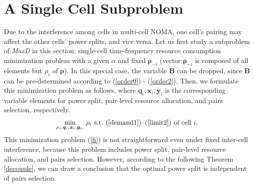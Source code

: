 \documentclass[10pt,journal,final,finalsubmission,twocolumn]{IEEEtran}
\begin{document}
\section{A Single Cell Subproblem}\label{CellLoadsMinimization}

Due to the interference among cells in multi-cell NOMA, one cell's pairing may affect the other cells' power splits, and vice versa. Let us first study a subproblem of {\em MaxD} in this section: single-cell time-frequency resource consumption minimization problem with a given $\alpha$ and fixed $\boldsymbol{\rho}_{-i}$ (vector $\boldsymbol{\rho}_{-i}$ is composed of all elements but $\rho_i$ of $\boldsymbol{\rho}$). In this special case, the variable $\boldsymbol{B}$ can be dropped, since $\boldsymbol{B}$ can be pre-determined according to (\ref{order0}) - (\ref{order2}). Then, we formulate this minimization problem as follows, where $\boldsymbol{q}_i,\boldsymbol{x}_i,\boldsymbol{y}_i$ is the corresponding variable elements for power split, pair-level resource allocation, and pairs selection, respectively.
\begin{equation}\label{fi}
 \underset{\rho_i, \boldsymbol{q}_i,\boldsymbol{x}_i,\boldsymbol{y}_i,}{\min} \  \rho_i \ \textup{s.t.\ (\ref{demand1})--(\ref{limit2}) of cell $i$} .
\end{equation}
This minimization problem (\ref{fi}) is not straightforward even under fixed inter-cell interference, because this problem includes power split,  pair-level resource allocation, and pairs selection. However, according to the following Theorem \ref{decouple}, we can draw a conclusion that the optimal power split is independent of pairs selection.
\end{document}

